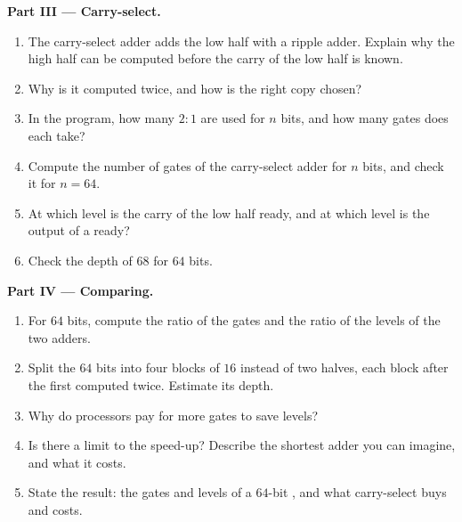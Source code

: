 \begin{problem}
\medskip\noindent\textbf{Part III --- Carry-select.}
\begin{enumerate}[resume]
  \item The carry-select adder adds the low half with a ripple adder. Explain why the high half can be computed
    before the carry of the low half is known.
  \item Why is it computed twice, and how is the right copy chosen?
  \item In the program, how many $2{:}1$  are used for $n$ bits, and how many gates does each take?
  \item Compute the number of gates of the carry-select adder for $n$ bits, and check it for $n = 64$.
  \item At which level is the carry of the low half ready, and at which level is the output of a  ready?
  \item Check the depth of $68$ for $64$ bits.
\end{enumerate}

\medskip\noindent\textbf{Part IV --- Comparing.}
\begin{enumerate}[resume]
  \item For $64$ bits, compute the ratio of the gates and the ratio of the levels of the two adders.
  \item Split the $64$ bits into four blocks of $16$ instead of two halves, each block after the first computed
    twice. Estimate its depth.
  \item Why do processors pay for more gates to save levels?
  \item Is there a limit to the speed-up? Describe the shortest adder you can imagine, and what it costs.
  \item State the result: the gates and levels of a $64$-bit , and what carry-select buys and costs.
\end{enumerate}
\end{problem}
